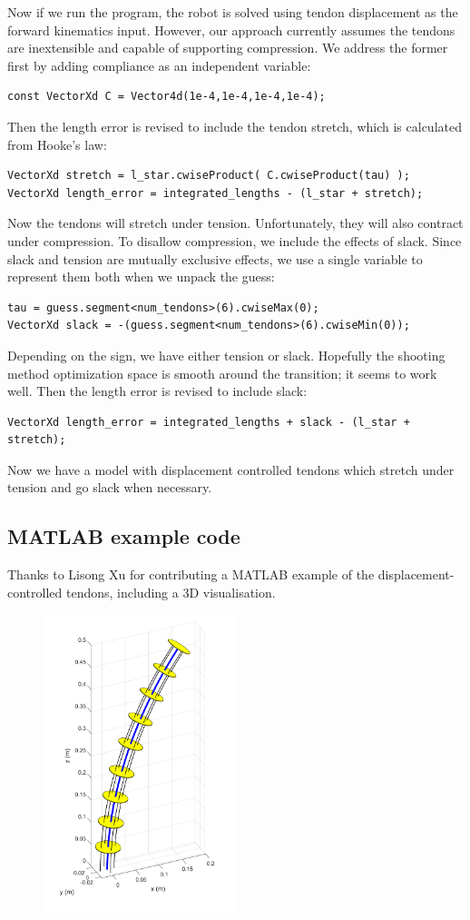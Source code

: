 \documentclass[12pt]{article}
\begin{document}
Now if we run the program, the robot is solved using tendon displacement as the forward kinematics input. However, our approach currently assumes the tendons are inextensible and capable of supporting compression. We address the former first by adding compliance as an independent variable:
\begin{lstlisting}
const VectorXd C = Vector4d(1e-4,1e-4,1e-4,1e-4);
\end{lstlisting}
Then the length error is revised to include the tendon stretch, which is calculated from Hooke's law:
\begin{lstlisting}
VectorXd stretch = l_star.cwiseProduct( C.cwiseProduct(tau) );
VectorXd length_error = integrated_lengths - (l_star + stretch);
\end{lstlisting}
Now the tendons will stretch under tension. Unfortunately, they will also contract under compression. 
To disallow compression, we include the effects of slack. Since slack and tension are mutually exclusive effects, we use a single variable to represent them both when we unpack the guess:
\begin{lstlisting}
tau = guess.segment<num_tendons>(6).cwiseMax(0);
VectorXd slack = -(guess.segment<num_tendons>(6).cwiseMin(0));
\end{lstlisting}
Depending on the sign, we have either tension or slack. Hopefully the shooting method optimization space is smooth around the transition; it seems to work well. Then the length error is revised to include slack:
\begin{lstlisting}
VectorXd length_error = integrated_lengths + slack - (l_star + stretch);
\end{lstlisting}
Now we have a model with displacement controlled tendons which stretch under tension and go slack when necessary.

\subsection{MATLAB example code}

Thanks to Lisong Xu for contributing a MATLAB example of the displacement-controlled tendons, including a 3D visualisation.

\begin{figure}[h]
	\centering
		\includegraphics[width=0.5\textwidth]{fig/TendonRobotMatlab.png}
\end{figure}
\end{document}
